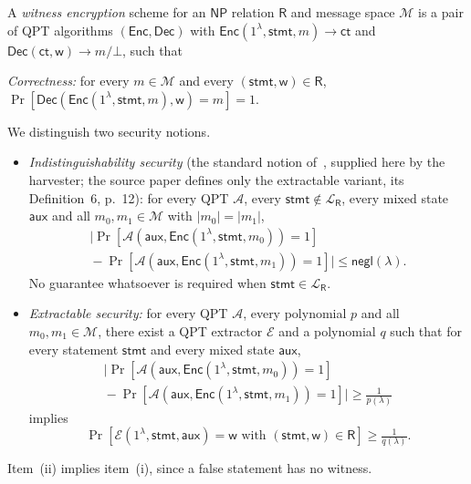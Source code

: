 \documentclass{conjura-conjecture}
\newcommand{\negl}{\mathsf{negl}}
\newcommand{\NP}{\mathsf{NP}}
\newcommand{\Rel}{\mathsf{R}}
\newcommand{\Msp}{\mathcal{M}}
\newcommand{\Lang}{\mathcal{L}}
\newcommand{\Enc}{\mathsf{Enc}}
\newcommand{\Dec}{\mathsf{Dec}}
\newcommand{\ct}{\mathsf{ct}}
\newcommand{\stmt}{\mathsf{stmt}}
\newcommand{\wit}{\mathsf{w}}
\newcommand{\aux}{\mathsf{aux}}
\begin{document}
\begin{definition}\label{def:we}
A \emph{witness encryption} scheme for an $\NP$ relation $\Rel$ and
message space $\Msp$ is a pair of QPT algorithms $(\Enc, \Dec)$ with
$\Enc(1^{\lambda}, \stmt, m) \to \ct$ and $\Dec(\ct, \wit) \to
m/\bot$, such that

\emph{Correctness:} for every $m \in \Msp$ and every $(\stmt, \wit)
\in \Rel$, $\Pr[\Dec(\Enc(1^{\lambda}, \stmt, m), \wit) = m] = 1$.

We distinguish two security notions.
\begin{itemize}[leftmargin=1.6em]
  \item[(i)] \emph{Indistinguishability security} (the standard
    notion of~\cite{GGSW13}, supplied here by the harvester; the
    source paper defines only the extractable variant, its
    Definition~6, p.~12): for every QPT $\mathcal{A}$, every $\stmt
    \notin \Lang_{\Rel}$, every mixed state $\aux$ and all $m_{0},
    m_{1} \in \Msp$ with $\lvert m_{0} \rvert = \lvert m_{1} \rvert$,
  \begin{multline*}
    \bigl| \Pr[\mathcal{A}(\aux, \Enc(1^{\lambda}, \stmt, m_{0}))
      = 1] \\
    {}- \Pr[\mathcal{A}(\aux, \Enc(1^{\lambda}, \stmt, m_{1}))
      = 1] \bigr| \le \negl(\lambda).
  \end{multline*}
  No guarantee whatsoever is required when $\stmt \in \Lang_{\Rel}$.
  \item[(ii)] \emph{Extractable security:} for every QPT
    $\mathcal{A}$, every polynomial $p$ and all $m_{0}, m_{1} \in
    \Msp$, there exist a QPT extractor $\mathcal{E}$ and a polynomial
    $q$ such that for every statement $\stmt$ and every mixed state
    $\aux$,
  \begin{multline*}
    \bigl| \Pr[\mathcal{A}(\aux, \Enc(1^{\lambda}, \stmt, m_{0}))
      = 1] \\
    {}- \Pr[\mathcal{A}(\aux, \Enc(1^{\lambda}, \stmt, m_{1}))
      = 1] \bigr| \ge \tfrac{1}{p(\lambda)}
  \end{multline*}
  implies
  \[
    \Pr[\mathcal{E}(1^{\lambda}, \stmt, \aux) = \wit
      \text{ with } (\stmt, \wit) \in \Rel] \ge \tfrac{1}{q(\lambda)}.
  \]
\end{itemize}
Item~(ii) implies item~(i), since a false statement has no witness.
\end{definition}
\end{document}
